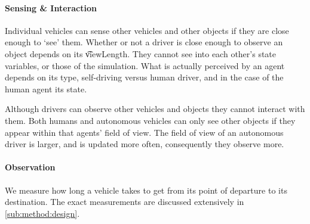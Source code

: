 
\paragraph{Sensing \& Interaction} 
Individual vehicles can sense other vehicles and other objects if they are close enough to `see' them. Whether or not a driver is close enough to observe an object depends on its \t{viewLength}. They cannot see into each other's state variables, or those of the simulation. What is actually perceived by an agent depends on its type, self-driving versus human driver, and in the case of the human agent its state. 

Although drivers can observe other vehicles and objects they cannot interact with them. Both humans and autonomous vehicles can only see other objects if they appear within that agents' field of view. The field of view of an autonomous driver is larger, and is updated more often, consequently they observe more.




\paragraph{Observation} 
We measure how long a vehicle takes to get from its point of departure to its destination. The exact measurements  are discussed extensively in \cref{sub:method:design}.


